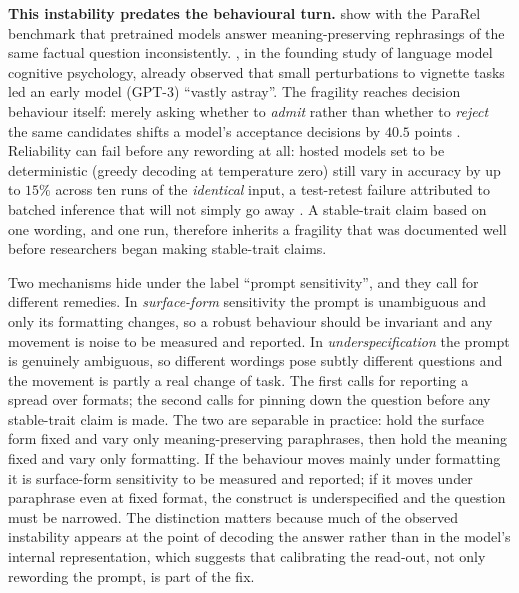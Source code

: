 \documentclass[11pt]{article}
\begin{document}
\textbf{This instability predates the behavioural turn.}
\citet{elazar2021measuring} show with the ParaRel benchmark that pretrained
models answer meaning-preserving rephrasings of the same factual question
inconsistently. \citet{binz2023cognitive}, in the founding study of language
model cognitive psychology, already observed that small perturbations to
vignette tasks led an early model (GPT-3) ``vastly astray''. The fragility
reaches decision behaviour itself: merely asking whether to \emph{admit}
rather than whether to \emph{reject} the same candidates shifts a model's
acceptance decisions by $40.5$ points \cite{echterhoff2024cognitive}.
Reliability can fail before any rewording at all: hosted models set to be
deterministic (greedy decoding at temperature zero) still vary in accuracy by
up to $15\%$ across ten runs of the \emph{identical} input, a test-retest
failure attributed to batched inference that will not simply go away
\cite{atil2025nondeterminism}. A stable-trait claim based on one wording,
and one run, therefore inherits a fragility that was documented well before
researchers began making stable-trait claims.

Two mechanisms hide under the label ``prompt sensitivity'', and they call for
different remedies. In \emph{surface-form} sensitivity the prompt is
unambiguous and only its formatting changes, so a robust behaviour should be
invariant and any movement is noise to be measured and reported. In
\emph{underspecification} the prompt is genuinely ambiguous, so different
wordings pose subtly different questions and the movement is partly a real
change of task. The first calls for reporting a spread over formats; the
second calls for pinning down the question before any stable-trait claim is
made. The two are separable in practice: hold the surface form fixed and vary
only meaning-preserving paraphrases, then hold the meaning fixed and vary only
formatting. If the behaviour moves mainly under formatting it is surface-form
sensitivity to be measured and reported; if it moves under paraphrase even at
fixed format, the construct is underspecified and the question must be
narrowed. The distinction matters because much of the observed instability
appears at the point of decoding the answer rather than in the model's
internal representation, which suggests that calibrating the read-out, not
only rewording the prompt, is part of the fix.
\end{document}
